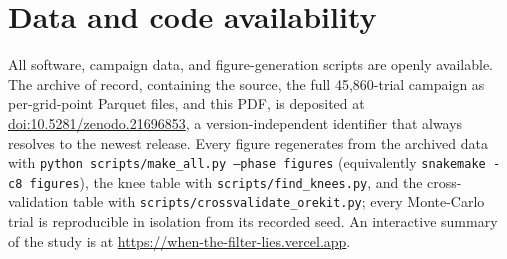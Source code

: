 \documentclass[11pt]{article}
\begin{document}









\section*{Data and code availability}
All software, campaign data, and figure-generation scripts are openly
available. The archive of record, containing the source, the full
45{,}860-trial campaign as per-grid-point Parquet files, and this PDF, is
deposited at
\href{https://doi.org/10.5281/zenodo.21696853}{doi:10.5281/zenodo.21696853},
a version-independent identifier that always resolves to the newest
release.
Every figure regenerates from the archived data with
\texttt{python scripts/make\_all.py --phase figures} (equivalently
\texttt{snakemake -c8 figures}), the knee table with
\texttt{scripts/find\_knees.py}, and the cross-validation table with
\texttt{scripts/crossvalidate\_orekit.py}; every Monte-Carlo trial is
reproducible in isolation from its recorded seed. An interactive summary of the
study is at \url{https://when-the-filter-lies.vercel.app}.




\appendix

\end{document}
